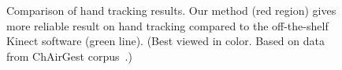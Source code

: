 \begin{figure}
\centering
{}
\caption{Comparison of hand tracking results. Our method (red region) gives more
reliable result on hand tracking compared to the off-the-shelf Kinect software
(green line). (Best viewed in color. Based on data from ChAirGest
corpus~\cite{Ruffieux2013}.)}
\label{fig:compare-skeleton}
\end{figure}
